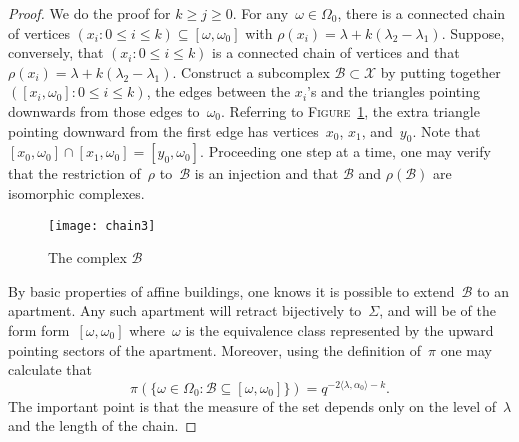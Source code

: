 \documentclass[a4paper]{amsart}
\newcommand{\sprod}[2]{{\langle #1, #2\rangle}}
\newcommand{\seq}[2]{\left({#1}: {#2}\right)}
\theoremstyle{plain}
\theoremstyle{definition}
\theoremstyle{remark}
\numberwithin{equation}{section}
\theoremstyle{plain}
\begin{document}
\begin{proof} We do the proof for $k\geq j\geq 0$.
  For any~$\omega\in\Omega_0$, there is a connected chain of vertices
  $\seq{x_i}{0\leq i\leq k}\subseteq[\omega,\omega_0]$ with
  $\rho(x_i)=\lambda+k(\lambda_2-\lambda_1)$.  Suppose, conversely,
  that $\seq{x_i}{0\leq i\leq k}$ is a connected chain of vertices and
  that $\rho(x_i)= \lambda+k(\lambda_2-\lambda_1)$.  Construct a
  subcomplex $\mathscr{B}\subset\mathscr{X}$ by putting together
  $\seq{[x_i,\omega_0]}{0\leq i\leq k}$, the edges between the $x_i$'s
  and the triangles pointing downwards from those edges to~$\omega_0$.
  Referring to \textsc{Figure~\ref{fig:chain}}, the extra triangle
  pointing downward from the first edge has vertices~$x_0$, $x_1$,
  and~$y_0$.  Note that
  $[x_0,\omega_0]\cap[x_1,\omega_0]=[y_0,\omega_0]$.  Proceeding one
  step at a time, one may verify that the restriction of~$\rho$
  to~$\mathscr{B}$ is an injection and that $\mathscr{B}$ and
  $\rho(\mathscr{B})$ are isomorphic complexes.
  
	\begin{figure}[h]
		\texttt{[image: chain3]}
		\caption{The complex $\mathscr{B}$}
		\label{fig:chain}
	\end{figure}

  By basic properties of affine buildings, one knows it is possible to
  extend~$\mathscr{B}$ to an apartment.  Any such apartment will
  retract bijectively to~$\Sigma$, and will be of the form
  form~$[\omega,\omega_0]$ where~$\omega$ is the equivalence class
  represented by the upward pointing sectors of the apartment.
  Moreover, using the definition of~$\pi$ one may calculate that
  \begin{equation*}
    \pi(\{\omega\in\Omega_0 : 
     \mathscr{B}\subseteq[\omega,\omega_0]\})
     =q^{-2\sprod{\lambda}{\alpha_0}-k} .
  \end{equation*}
  The important point is that the measure of the set depends only on
  the level of~$\lambda$ and the length of the chain.


\end{proof}
\end{document}
